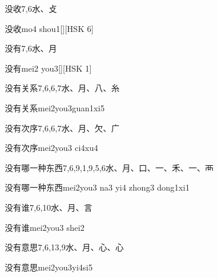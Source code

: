 \begin{Entry}{没收}{7,6}{⽔、⽁}
  \begin{Phonetics}{没收}{mo4 shou1}[][HSK 6]
  \end{Phonetics}
\end{Entry}

\begin{Entry}{没有}{7,6}{⽔、⽉}
  \begin{Phonetics}{没有}{mei2 you3}[][HSK 1]
  \end{Phonetics}
\end{Entry}

\begin{Entry}{没有关系}{7,6,6,7}{⽔、⽉、⼋、⽷}
  \begin{Phonetics}{没有关系}{mei2you3guan1xi5}
  \end{Phonetics}
\end{Entry}

\begin{Entry}{没有次序}{7,6,6,7}{⽔、⽉、⽋、⼴}
  \begin{Phonetics}{没有次序}{mei2you3 ci4xu4}
  \end{Phonetics}
\end{Entry}

\begin{Entry}{没有哪一种东西}{7,6,9,1,9,5,6}{⽔、⽉、⼝、⼀、⽲、⼀、⾑}
  \begin{Phonetics}{没有哪一种东西}{mei2you3 na3 yi4 zhong3 dong1xi1}
  \end{Phonetics}
\end{Entry}

\begin{Entry}{没有谁}{7,6,10}{⽔、⽉、⾔}
  \begin{Phonetics}{没有谁}{mei2you3 shei2}
  \end{Phonetics}
\end{Entry}

\begin{Entry}{没有意思}{7,6,13,9}{⽔、⽉、⼼、⼼}
  \begin{Phonetics}{没有意思}{mei2you3yi4si5}
  \end{Phonetics}
\end{Entry}

